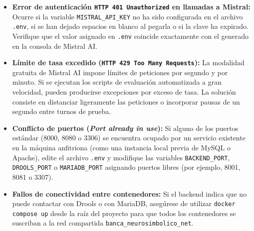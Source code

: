 \begin{itemize}
    \item \textbf{Error de autenticación \texttt{HTTP 401 Unauthorized} en llamadas a Mistral:} Ocurre si la variable \texttt{MISTRAL\_API\_KEY} no ha sido configurada en el archivo \texttt{.env}, si se han dejado espacios en blanco al pegarla o si la clave ha expirado. Verifique que el valor asignado en \texttt{.env} coincide exactamente con el generado en la consola de Mistral AI.
    
    \item \textbf{Límite de tasa excedido (\texttt{HTTP 429 Too Many Requests}):} La modalidad gratuita de Mistral AI impone límites de peticiones por segundo y por minuto. Si se ejecutan los scripts de evaluación automatizada a gran velocidad, pueden producirse excepciones por exceso de tasa. La solución consiste en distanciar ligeramente las peticiones o incorporar pausas de un segundo entre turnos de prueba.

    \item \textbf{Conflicto de puertos (\textit{Port already in use}):} Si alguno de los puertos estándar (8000, 8080 o 3306) se encuentra ocupado por un servicio existente en la máquina anfitriona (como una instancia local previa de MySQL o Apache), edite el archivo \texttt{.env} y modifique las variables \texttt{BACKEND\_PORT}, \texttt{DROOLS\_PORT} o \texttt{MARIADB\_PORT} asignando puertos libres (por ejemplo, 8001, 8081 o 3307).

    \item \textbf{Fallos de conectividad entre contenedores:} Si el backend indica que no puede contactar con Drools o con MariaDB, asegúrese de utilizar \texttt{docker compose up} desde la raíz del proyecto para que todos los contenedores se suscriban a la red compartida \texttt{banca\_neurosimbolico\_net}.
\end{itemize}
